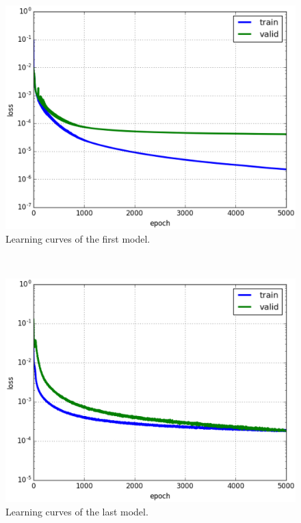 \documentclass[conference]{IEEEtran}
\begin{document}
\begin{figure}[h!]
	\centerline{\includegraphics[scale=0.45]{images/loss_model_1.eps}}
	\caption{Learning curves of the first model.}
	\label{figloss1}
\end{figure}~\\
\begin{figure}[h!]
	\centerline{\includegraphics[scale=0.45]{images/loss_v16.eps}}
	\caption{Learning curves of the last model.}
	\label{figloss}
\end{figure}
\end{document}
